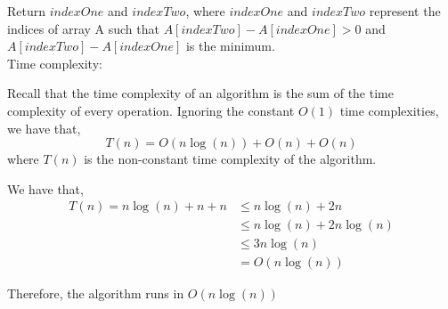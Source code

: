 \documentclass[12pt]{book}
\begin{document}
\begin{enumerate}
    Return $indexOne$ and $indexTwo$, where $indexOne$ and $indexTwo$ represent the indices of array A such that $A[indexTwo] - A[indexOne] > 0$ and $A[indexTwo] - A[indexOne]$ is the minimum.\\
    
    Time complexity:
    
    Recall that the time complexity of an algorithm is the sum of the time complexity of every operation. Ignoring the constant $O(1)$ time complexities, we have that,
    $$T(n) = O(n\log(n)) + O(n) + O(n)$$
    where $T(n)$ is the non-constant time complexity of the algorithm.
    
    We have that,
    \begin{align*}
        T(n) = n\log(n) + n + n &\leq n\log(n) + 2n\\
        &\leq n\log(n) + 2n\log(n)\\
        &\leq 3n\log(n)\\
        &= O(n\log(n))
    \end{align*}
    
    Therefore, the algorithm runs in $O(n\log(n))$
    
    
    
    
\end{enumerate}
\end{document}
